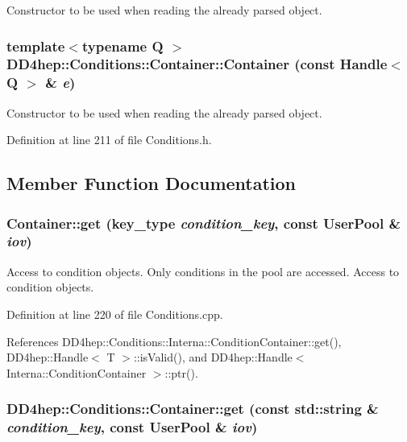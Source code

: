 Constructor to be used when reading the already parsed object. \hypertarget{class_d_d4hep_1_1_conditions_1_1_container_ad410e344fd97b872c2195b9ed9010d02}{
\subsubsection[{Container}]{\setlength{\rightskip}{0pt plus 5cm}template$<$typename Q $>$ DD4hep::Conditions::Container::Container (const {\bf Handle}$<$ Q $>$ \& {\em e})}}
\label{class_d_d4hep_1_1_conditions_1_1_container_ad410e344fd97b872c2195b9ed9010d02}


Constructor to be used when reading the already parsed object. 

Definition at line 211 of file Conditions.h.

\subsection{Member Function Documentation}
\hypertarget{class_d_d4hep_1_1_conditions_1_1_container_a6364c939553b81e4c5e05ac98d7f01a0}{
\subsubsection[{get}]{ Container::get ({\bf key\_\-type} {\em condition\_\-key}, \/  const {\bf UserPool} \& {\em iov})}}
\label{class_d_d4hep_1_1_conditions_1_1_container_a6364c939553b81e4c5e05ac98d7f01a0}


Access to condition objects. Only conditions in the pool are accessed. Access to condition objects. 

Definition at line 220 of file Conditions.cpp.

References DD4hep::Conditions::Interna::ConditionContainer::get(), DD4hep::Handle$<$ T $>$::isValid(), and DD4hep::Handle$<$ Interna::ConditionContainer $>$::ptr().\hypertarget{class_d_d4hep_1_1_conditions_1_1_container_a8ebd515fda282d4269ee2fb72e65481b}{
\subsubsection[{get}]{ DD4hep::Conditions::Container::get (const std::string \& {\em condition\_\-key}, \/  const {\bf UserPool} \& {\em iov})}}
\label{class_d_d4hep_1_1_conditions_1_1_container_a8ebd515fda282d4269ee2fb72e65481b}


